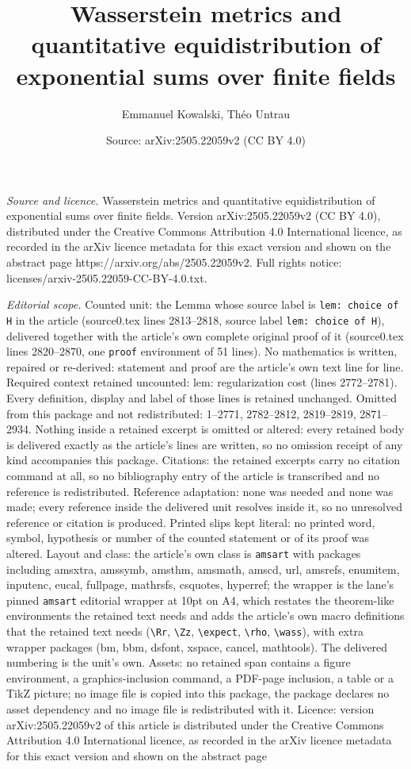 \documentclass[10pt,a4paper]{amsart}
\title[Wasserstein metrics and quantitative equidistribution of exp]{Wasserstein metrics and quantitative equidistribution of exponential sums over finite fields}
\author{Emmanuel Kowalski, Th\'eo Untrau}
\date{Source: arXiv:2505.22059v2 (CC BY 4.0)}
\begin{document}
\maketitle

\noindent\emph{Source and licence.} Wasserstein metrics and quantitative equidistribution of exponential sums over finite fields. Version arXiv:2505.22059v2 (CC BY 4.0), distributed under the Creative Commons Attribution 4.0 International licence, as recorded in the arXiv licence metadata for this exact version and shown on the abstract page https://arxiv.org/abs/2505.22059v2. Full rights notice: licenses/arxiv-2505.22059-CC-BY-4.0.txt.\par\smallskip

\noindent\textit{Editorial scope.} Counted unit: the Lemma whose source label is \texttt{lem: choice of H} in the article (source0.tex lines 2813--2818, source label \texttt{lem: choice of H}), delivered together with the article's own complete original proof of it (source0.tex lines 2820--2870, one \texttt{proof} environment of 51 lines). No mathematics is written, repaired or re-derived: statement and proof are the article's own text line for line. Required context retained uncounted: lem: regularization cost (lines 2772--2781). Every definition, display and label of those lines is retained unchanged. Omitted from this package and not redistributed: 1--2771, 2782--2812, 2819--2819, 2871--2934. Nothing inside a retained excerpt is omitted or altered: every retained body is delivered exactly as the article's lines are written, so no omission receipt of any kind accompanies this package. Citations: the retained excerpts carry no citation command at all, so no bibliography entry of the article is transcribed and no reference is redistributed. Reference adaptation: none was needed and none was made; every reference inside the delivered unit resolves inside it, so no unresolved reference or citation is produced. Printed slips kept literal: no printed word, symbol, hypothesis or number of the counted statement or of its proof was altered. Layout and class: the article's own class is \texttt{amsart} with packages including amsxtra, amssymb, amsthm, amsmath, amscd, url, amsrefs, enumitem, inputenc, eucal, fullpage, mathrsfs, csquotes, hyperref; the wrapper is the lane's pinned \texttt{amsart} editorial wrapper at 10pt on A4, which restates the theorem-like environments the retained text needs and adds the article's own macro definitions that the retained text needs (\texttt{\textbackslash Rr}, \texttt{\textbackslash Zz}, \texttt{\textbackslash expect}, \texttt{\textbackslash rho}, \texttt{\textbackslash wass}), with extra wrapper packages (bm, bbm, dsfont, xspace, cancel, mathtools). The delivered numbering is the unit's own. Assets: no retained span contains a figure environment, a graphics-inclusion command, a PDF-page inclusion, a table or a TikZ picture; no image file is copied into this package, the package declares no asset dependency and no image file is redistributed with it. Licence: version arXiv:2505.22059v2 of this article is distributed under the Creative Commons Attribution 4.0 International licence, as recorded in the arXiv licence metadata for this exact version and shown on the abstract page 
\end{document}
